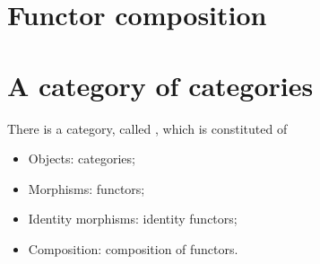 \section{Functor composition}



\section{A category of categories}


\begin{ctdefinition}
  There is a category, called \Category, which is constituted of
  \begin{itemize}
    \item Objects: categories;
    \item Morphisms: functors;
    \item Identity morphisms: identity functors;
    \item Composition: composition of functors.
  \end{itemize}
\end{ctdefinition}
